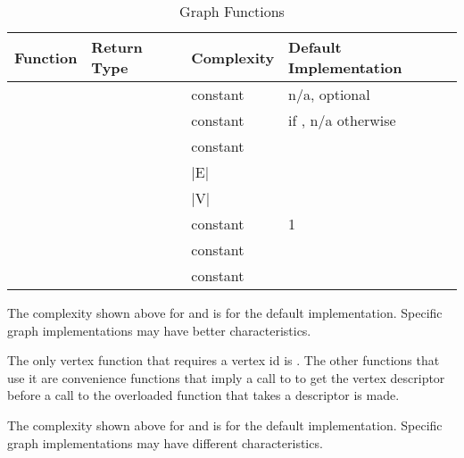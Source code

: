 \begin{table}[h!]
\begin{center}
\resizebox{\textwidth}{!}
{\begin{tabular}{l l p{2.3cm} L{6.2cm}}
\hline
    \textbf{Function} & \textbf{Return Type} & \textbf{Complexity} & \textbf{Default Implementation} \\
\hline
     &  & constant & n/a, optional \\
     &  & constant &  if , n/a otherwise \\
     &  & constant &  \\
     &  & |E| &  \\
     &  & |V| &  \\
\hdashline
     &  & constant & 1 \\
     &  & constant &  \\
     &  & constant &   \\
\hline
\end{tabular}}
\caption{Graph Functions}
\label{tab:graph_func}
\end{center}
\end{table}
The complexity shown above for  and  is for the default implementation. 
Specific graph implementations may have better characteristics.

The only vertex function that requires a vertex id  is . The other 
functions that use it are convenience functions that imply a call to  to get the 
vertex descriptor before a call to the overloaded function that takes a descriptor is made.

The complexity shown above for  and  is for the default
implementation. Specific graph implementations may have different characteristics.

